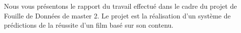 Nous vous présentons le rapport du travail effectué dans le cadre du projet de Fouille de Données de master 2. Le projet est la réalisation d’un système de prédictions de la réussite d’un film basé sur son contenu. 